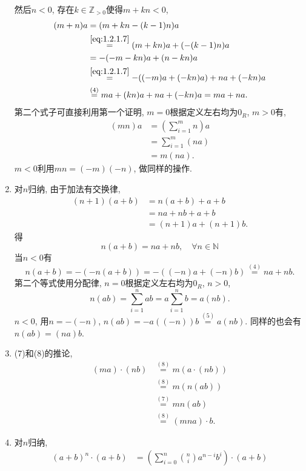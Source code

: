 \begin{solution}
\begin{enumerate}[(1)]
    然后$n < 0$, 存在$k\in \mathbb{Z}_{>0}$使得$m + kn < 0$,
    \[
    \begin{aligned}
        (m + n)a &= (m + kn - (k - 1)n)a\\
        &\overset{\eqref{eq:1.2.1.7}}= (m + kn)a + (-(k - 1)n)a\\
        &= -(-m - kn)a + (n - kn)a\\
        &\overset{\eqref{eq:1.2.1.7}}= -((-m)a + (-kn)a) + na + (-kn)a\\
        &\overset{(4)}= ma + (kn)a + na + (-kn)a = ma + na.
    \end{aligned}   
    \]
        第二个式子可直接利用第一个证明, 
    $m = 0$根据定义左右均为$0_R$, $m > 0$有, 
    \[
    \begin{aligned}
        (mn)a &= \left(\sum_{i = 1}^{m} n\right)a\\
        &= \sum_{i = 1}^{m} (na)\\
        &= m(na).
    \end{aligned}
    \]
    $m < 0$利用$mn = (-m)(-n)$, 做同样的操作.
        \item 对$n$归纳, 由于加法有交换律,
    \[
    \begin{aligned}
        (n + 1)(a + b) &= n(a + b) + a + b\\
        &= na + nb + a + b\\
        &= (n + 1)a + (n + 1)b.
    \end{aligned}
    \]
    得
    \[
        n(a + b) = na + nb, \quad \forall n \in \mathbb{N}
    \]
    当$n < 0$有
    \[
        n(a + b) = -(-n(a + b)) = -((-n)a + (-n)b) \overset{(4)}= na + nb.
    \]
    第二个等式使用分配律, $n = 0$根据定义左右均为$0_R$, $n > 0$,
    \[
        n(ab) = \sum_{i = 1}^{n} ab = a\sum_{i = 1}^{n} b = a(nb).
    \]
    $n < 0$, 用$n = -(-n)$, $n(ab) = -a((-n))b \overset{(5)}= a(nb)$.
    同样的也会有$n(ab) = (na)b$.
        \item (7)和(8)的推论, 
    \[
    \begin{aligned}
        (ma) \cdot (nb) &\overset{(8)}= m(a \cdot (nb))\\
        &\overset{(8)}= m(n(ab))\\
        &\overset{(7)}= mn(ab)\\
        &\overset{(8)}= (mna) \cdot b.
    \end{aligned}
    \]
        \item 对$n$归纳,
    \[
    \begin{aligned}
        (a + b)^n \cdot (a + b) &= \left(\sum_{i = 0}^{n} \binom{n}{i} a^{n - i}b^i\right) \cdot (a + b)\\

\end{aligned}\]
\end{enumerate}
\end{solution}
